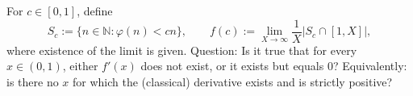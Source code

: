 For $c\in[0,1]$, define
\[
S_c:=\{n\in\mathbb{N}: \varphi(n)<cn\},\qquad f(c):=\lim_{X\to\infty}\frac{1}{X}|S_c\cap [1,X]|,
\]
where existence of the limit is given.
Question: Is it true that for every $x\in(0,1)$, either $f'(x)$ does not exist, or it exists but equals $0$?
Equivalently: is there no $x$ for which the (classical) derivative exists and is strictly positive?
